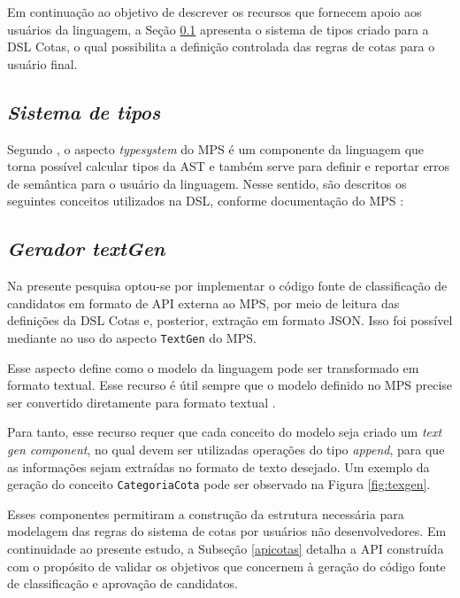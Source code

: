 



Em continuação ao objetivo de descrever os recursos que fornecem apoio aos usuários da linguagem, a Seção \ref{sub:sec:typesystem} apresenta o sistema de tipos criado para a DSL Cotas, o qual possibilita a definição controlada das regras de cotas para o usuário final.

\subsection{\textit{Sistema de tipos}}
\label{sub:sec:typesystem}

Segundo , o aspecto \textit{typesystem} do \gls{MPS} é um componente da linguagem que torna possível calcular tipos da \gls{AST} e também serve para definir e reportar erros de semântica para o usuário da linguagem. Nesse sentido, são descritos os seguintes conceitos utilizados na DSL, conforme documentação do \gls{MPS} :




\newpage
\subsection{\textit{Gerador textGen}}
\label{sub:sec:texgen}

Na presente pesquisa optou-se por implementar o código fonte de classificação de candidatos em formato de \gls{API} externa ao \gls{MPS}, por meio de leitura das definições da DSL Cotas e, posterior, extração em formato JSON. Isso foi possível mediante ao uso do aspecto \texttt{TextGen} do MPS.

Esse aspecto define como o modelo da linguagem pode ser transformado em formato textual. Esse recurso é útil sempre que o modelo definido no MPS precise ser convertido diretamente para formato textual \cite{jetbrains}. 

Para tanto, esse recurso requer que cada conceito do modelo seja criado um \textit{text gen component}, no qual devem ser utilizadas operações do tipo \textit{append}, para que as informações sejam extraídas no formato de texto desejado. Um exemplo da geração do conceito \texttt{CategoriaCota} pode ser observado na Figura \ref{fig:texgen}.




Esses componentes permitiram a construção da estrutura necessária para modelagem das regras do sistema de cotas por usuários não desenvolvedores. Em continuidade ao presente estudo, a Subseção \ref{apicotas} detalha a \gls{API} construída com o propósito de validar os objetivos que concernem à geração do código fonte de classificação e aprovação de candidatos.

\newpage